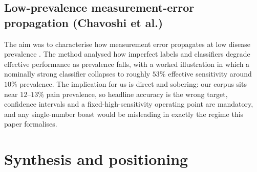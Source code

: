 \subsection{Low-prevalence measurement-error propagation (Chavoshi et al.)}
The aim was to characterise how measurement error propagates at low disease
prevalence \cite{chavoshi2025}. The method analysed how imperfect labels and
classifiers degrade effective performance as prevalence falls, with a worked
illustration in which a nominally strong classifier collapses to roughly $53\%$
effective sensitivity around $10\%$ prevalence. The implication for us is direct
and sobering: our corpus sits near $12$--$13\%$ pain prevalence, so headline
accuracy is the wrong target, confidence intervals and a fixed-high-sensitivity
operating point are mandatory, and any single-number boast would be misleading
in exactly the regime this paper formalises.

\section{Synthesis and positioning}
\label{sec:bg-synthesis}


